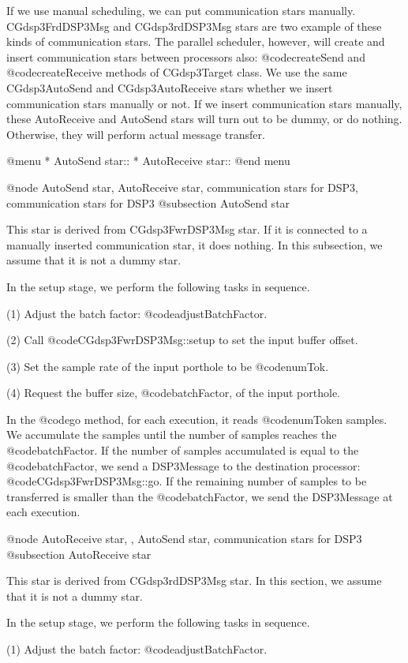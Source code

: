 {If we use manual scheduling, we can put communication stars manually.
CGdsp3FrdDSP3Msg and CGdsp3rdDSP3Msg stars are two example of these kinds
of communication stars. The parallel scheduler, however, will create and insert
communication stars between processors also: @code{createSend} and
@code{createReceive} methods of CGdsp3Target class. We use the same
CGdsp3AutoSend and CGdsp3AutoReceive stars whether we insert communication
stars manually or not. If we insert communication stars manually, these
AutoReceive and AutoSend stars will turn out to be dummy, or do nothing.
Otherwise, they will perform actual message transfer.

@menu
* AutoSend star::
* AutoReceive star::
@end menu

@node AutoSend star, AutoReceive star, communication stars for DSP3, communication stars for DSP3
@subsection AutoSend star

This star is derived from CGdsp3FwrDSP3Msg star. If it is connected to a
manually inserted communication star, it does nothing. In this subsection,
we assume that it is not a dummy star.

In the setup stage, we perform the following tasks in sequence.

(1) Adjust the batch factor: @code{adjustBatchFactor}.

(2) Call @code{CGdsp3FwrDSP3Msg::setup} to set the input buffer offset.

(3) Set the sample rate of the input porthole to be @code{numTok}.

(4) Request the buffer size, @code{batchFactor}, of the input porthole.

In the @code{go} method, for each execution, it reads @code{numToken} samples.
We accumulate the samples until the number of samples reaches 
the @code{batchFactor}. If the number of samples accumulated is equal to the
@code{batchFactor}, we send a DSP3Message to the destination processor:
@code{CGdsp3FwrDSP3Msg::go}. If the remaining number of samples to be
transferred is smaller than the @code{batchFactor}, we send the DSP3Message
at each execution.

@node AutoReceive star, , AutoSend star, communication stars for DSP3
@subsection AutoReceive star

This star is derived from CGdsp3rdDSP3Msg star. In this section, we assume
that it is not a dummy star.

In the setup stage, we perform the following tasks in sequence.

(1) Adjust the batch factor: @code{adjustBatchFactor}.

}
